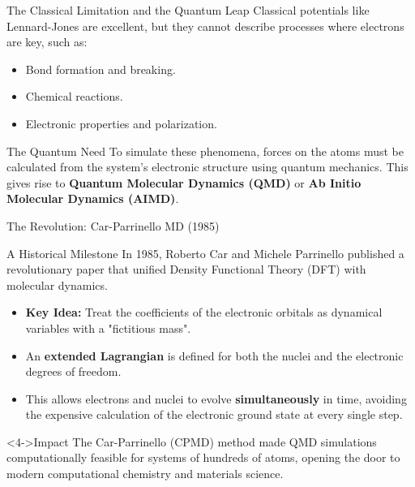 \begin{frame}{The Classical Limitation and the Quantum Leap}
    Classical potentials like Lennard-Jones are excellent, but they cannot describe processes where electrons are key, such as:
    \pause
    \begin{itemize}
        \item Bond formation and breaking.
        \item Chemical reactions.
        \item Electronic properties and polarization.
    \end{itemize}
    \pause
    \bigskip
    
    \begin{block}{The Quantum Need}
        To simulate these phenomena, forces on the atoms must be calculated from the system's electronic structure using quantum mechanics. This gives rise to \textbf{Quantum Molecular Dynamics (QMD)} or \textbf{Ab Initio Molecular Dynamics (AIMD)}.
    \end{block}
\end{frame}


\begin{frame}{The Revolution: Car-Parrinello MD (1985)}
    \begin{block}{A Historical Milestone}
        In 1985, Roberto Car and Michele Parrinello published a revolutionary paper that unified Density Functional Theory (DFT) with molecular dynamics.
    \end{block}
    \pause
    
    \begin{itemize}
        \item \textbf{Key Idea:} Treat the coefficients of the electronic orbitals as dynamical variables with a "fictitious mass".
        \pause
        \item An \textbf{extended Lagrangian} is defined for both the nuclei and the electronic degrees of freedom.
        \pause
        \item This allows electrons and nuclei to evolve \textbf{simultaneously} in time, avoiding the expensive calculation of the electronic ground state at every single step.
    \end{itemize}
    \pause
    
    \begin{exampleblock}<4->{Impact}
        The Car-Parrinello (CPMD) method made QMD simulations computationally feasible for systems of hundreds of atoms, opening the door to modern computational chemistry and materials science.
    \end{exampleblock}
\end{frame}

